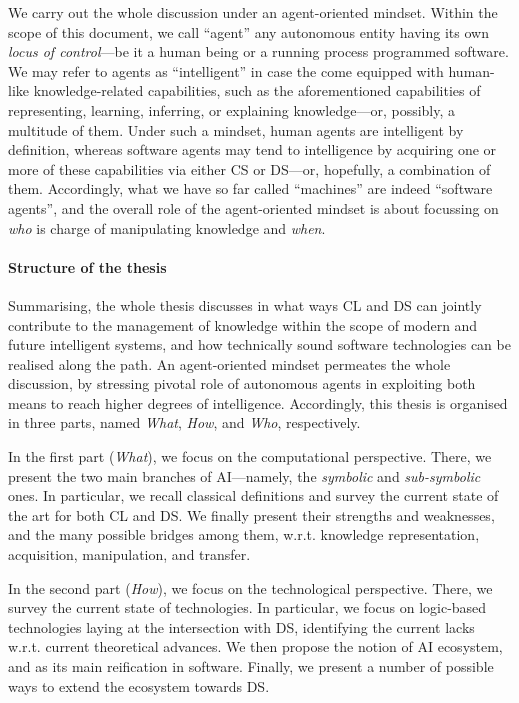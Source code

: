 \documentclass[12pt,a4paper,openright,twoside]{book}
\begin{document}
We carry out the whole discussion under an agent-oriented mindset.
%
Within the scope of this document, we call ``agent'' any autonomous entity having its own \emph{locus of control}---be it a human being or a running process programmed software.
%
We may refer to agents as ``intelligent'' in case the come equipped with human-like knowledge-related capabilities, such as the aforementioned capabilities of representing, learning, inferring, or explaining knowledge---or, possibly, a multitude of them.
%
Under such a mindset, human agents are intelligent by definition, whereas software agents may tend to intelligence by acquiring one or more of these capabilities via either CS or DS---or, hopefully, a combination of them.
%
Accordingly, what we have so far called ``machines'' are indeed ``software agents'', and the overall role of the agent-oriented mindset is about focussing on \emph{who} is charge of manipulating knowledge and \emph{when}. %


\paragraph{Structure of the thesis}

Summarising, the whole thesis discusses in what ways CL and DS can jointly contribute to the management of knowledge within the scope of modern and future intelligent systems, and how technically sound software technologies can be realised along the path.
%
An agent-oriented mindset permeates the whole discussion, by stressing pivotal role of autonomous agents in exploiting both means to reach higher degrees of intelligence.
%
Accordingly, this thesis is organised in three parts, named \emph{What}, \emph{How}, and \emph{Who}, respectively.

In the first part (\emph{What}), we focus on the computational perspective.
%
There, we present the two main branches of AI---namely, the \emph{symbolic} and \emph{sub-symbolic} ones.
%
In particular, we recall classical definitions and survey the current state of the art for both CL and DS.
%
We finally present their strengths and weaknesses, and the many possible bridges among them, w.r.t. knowledge representation, acquisition, manipulation, and transfer.

In the second part (\emph{How}), we focus on the technological perspective.
%
There, we survey the current state of technologies.
%
In particular, we focus on logic-based technologies laying at the intersection with DS, identifying the current lacks w.r.t. current theoretical advances.
%
We then propose the notion of AI ecosystem, and \twopkt{} as its main reification in software.
%
Finally, we present a number of possible ways to extend the \twopkt{} ecosystem towards DS.
\end{document}
